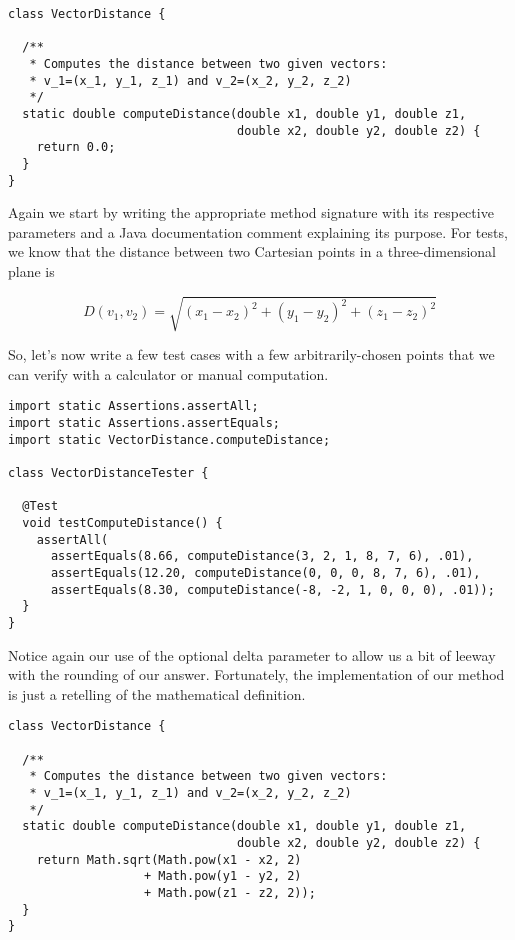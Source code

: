 \begin{cl}{}
\begin{lstlisting}[language=MyJava]
class VectorDistance {

  /**
   * Computes the distance between two given vectors:
   * v_1=(x_1, y_1, z_1) and v_2=(x_2, y_2, z_2)
   */
  static double computeDistance(double x1, double y1, double z1, 
                                double x2, double y2, double z2) {
    return 0.0;
  }
}
\end{lstlisting}
\end{cl}

Again we start by writing the appropriate method signature with its respective parameters and a Java documentation comment explaining its purpose. For tests, we know that the distance between two Cartesian points in a three-dimensional plane is 

\[
D(v_1, v_2) = \sqrt{(x_1 - x_2)^2 + (y_1 - y_2)^2 + (z_1 - z_2)^2}
\]

So, let's now write a few test cases with a few arbitrarily-chosen points that we can verify with a calculator or manual computation.

\begin{cl}{}
\begin{lstlisting}[language=MyJava]
import static Assertions.assertAll;
import static Assertions.assertEquals;
import static VectorDistance.computeDistance;

class VectorDistanceTester {

  @Test
  void testComputeDistance() {
    assertAll(
      assertEquals(8.66, computeDistance(3, 2, 1, 8, 7, 6), .01),
      assertEquals(12.20, computeDistance(0, 0, 0, 8, 7, 6), .01),
      assertEquals(8.30, computeDistance(-8, -2, 1, 0, 0, 0), .01));
  }
}
\end{lstlisting}
\end{cl}

Notice again our use of the optional delta parameter to allow us a bit of leeway with the rounding of our answer. Fortunately, the implementation of our method is just a retelling of the mathematical definition.

\begin{cl}{}
\begin{lstlisting}[language=MyJava]
class VectorDistance {

  /**
   * Computes the distance between two given vectors:
   * v_1=(x_1, y_1, z_1) and v_2=(x_2, y_2, z_2)
   */
  static double computeDistance(double x1, double y1, double z1, 
                                double x2, double y2, double z2) {
    return Math.sqrt(Math.pow(x1 - x2, 2) 
                   + Math.pow(y1 - y2, 2)
                   + Math.pow(z1 - z2, 2));
  }
}
\end{lstlisting}
\end{cl}

